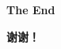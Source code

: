 
\begin{frame}

\Huge{\centerline{\bfseries The End}}

\vspace{0.5em}

\Huge{\centerline{\phantom{a}\bfseries 谢谢！}}

\end{frame}



